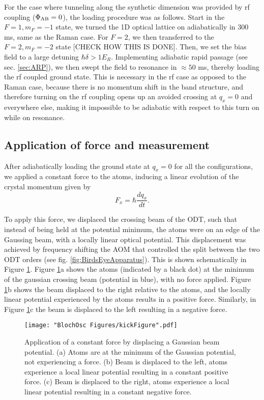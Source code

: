 For the case where tunneling along the synthetic dimension was provided by rf coupling ($\Phi_{\rm AB}=0$), the loading procedure was as follows. Start in the $F=1,m_F=-1$ state, we turned the 1D optical lattice on adiabatically in $300$ ms, same as the Raman case. For $F=2$, we then transferred to the $F=2,m_F=-2$ state [CHECK HOW THIS IS DONE]. Then, we set the bias field to a large detuning $\hbar\delta>1 E_R$. Implementing adiabatic rapid passage (see sec. \ref{sec:ARP}), we then swept the field to resonance in $\approx 50$ ms, thereby loading the rf coupled ground state. This is necessary in the rf case as opposed to the Raman case, because there is no momentum shift in the band structure, and therefore turning on the rf coupling opens up an avoided crossing at $q_x=0$ and everywhere else, making it impossible to be adiabatic with respect to this turn on while on resonance. 

\subsection{Application of force and measurement}
After adiabatically loading the ground state at $q_x=0$ for all the configurations, we applied a constant force to the atoms, inducing a linear evolution of the crystal momentum given by
\begin{equation}
F_x=\hbar\frac{dq_x}{dt}.
\end{equation} 	

To apply this force, we displaced the crossing beam of the ODT, such that instead of being held at the potential minimum, the atoms were on an edge of the Gaussing beam, with a locally linear optical potential. This displacement was achieved by frequency shifting the AOM that controlled the split between the two ODT orders (see fig. \ref{fig:BirdsEyeApparatus}). This is shown schematically in Figure \ref{fig:kickFigure}. Figure \ref{fig:kickFigure}a shows the atoms (indicated by a black dot) at the minimum of the gaussian crossing beam (potential in blue), with no force applied. Figure \ref{fig:kickFigure}b shows the beam displaced to the right relative to the atoms, and the locally linear potential experienced by the atoms results in a positive force. Similarly, in Figure \ref{fig:kickFigure}c the beam is displaced to the left resulting in a negative force. 

\begin{figure}
\texttt{[image: "BlochOsc Figures/kickFigure".pdf]}
\caption{Application of a constant force by displacing a Gaussian beam potential. (a) Atoms are at the minimum of the Gaussian potential, not experiencing a force. (b) Beam is displaced to the left, atoms experience a local linear potential resulting in a constant positive force. (c) Beam is displaced to the right, atoms experience a local linear potential resulting in a constant negative force.  }
\label{fig:kickFigure}
\end{figure}

